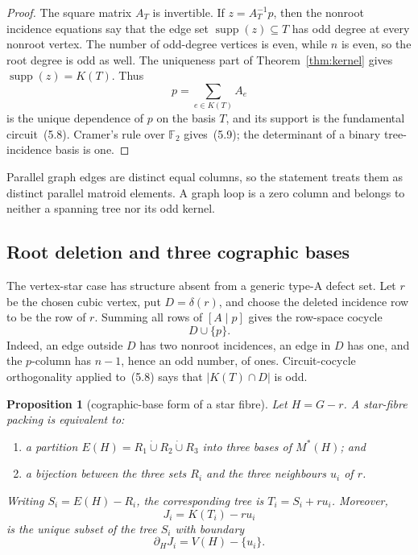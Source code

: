 \documentclass[11pt]{article}
\newtheorem{proposition}[theorem]{Proposition}
\theoremstyle{definition}
\theoremstyle{remark}
\newcommand{\F}{\mathbb F}
\newcommand{\supp}{\operatorname{supp}}
\newcommand{\1}{\mathbf 1}
\begin{document}
\begin{proof}
The square matrix \(A_T\) is invertible.  If
\(z=A_T^{-1}p\), then the nonroot incidence equations say that the edge
set \(\supp(z)\subseteq T\) has odd degree at every nonroot vertex.
The number of odd-degree vertices is even, while \(n\) is even, so the
root degree is odd as well.  The uniqueness part of
Theorem~\ref{thm:kernel} gives \(\supp(z)=K(T)\).  Thus
\[
 p=\sum_{e\in K(T)}A_e
\]
is the unique dependence of \(p\) on the basis \(T\), and its support is
the fundamental circuit~(5.8).  Cramer's rule over \(\F_2\) gives~(5.9);
the determinant of a binary tree-incidence basis is one.
\end{proof}

Parallel graph edges are distinct equal columns, so the statement treats
them as distinct parallel matroid elements.  A graph loop is a zero column
and belongs to neither a spanning tree nor its odd kernel.

\subsection{Root deletion and three cographic bases}

The vertex-star case has structure absent from a generic type-A defect
set.  Let \(r\) be the chosen cubic vertex, put \(D=\delta(r)\), and choose
the deleted incidence row to be the row of \(r\).  Summing all rows of
\([A\mid p]\) gives the row-space cocycle
\[
 D\cup\{p\}.                                             \tag{5.10}
\]
Indeed, an edge outside \(D\) has two nonroot incidences, an edge in \(D\)
has one, and the \(p\)-column has \(n-1\), hence an odd number, of ones.
Circuit-cocycle orthogonality applied to~(5.8) says that
\(|K(T)\cap D|\) is odd.

\begin{proposition}[cographic-base form of a star fibre]
\label{prop:cographic}
Let \(H=G-r\).  A star-fibre packing is equivalent to:
\begin{enumerate}
\item a partition \(E(H)=R_1\mathbin{\dot\cup}R_2
      \mathbin{\dot\cup}R_3\) into three bases of \(M^*(H)\); and
\item a bijection between the three sets \(R_i\) and the three neighbours
      \(u_i\) of \(r\).
\end{enumerate}
Writing \(S_i=E(H)-R_i\), the corresponding tree is
\(T_i=S_i+ru_i\).  Moreover,
\[
 J_i=K(T_i)-ru_i
\]
is the unique subset of the tree \(S_i\) with boundary
\[
 \partial_HJ_i=V(H)-\{u_i\}.                             \tag{5.11}
\]
\end{proposition}
\end{document}
